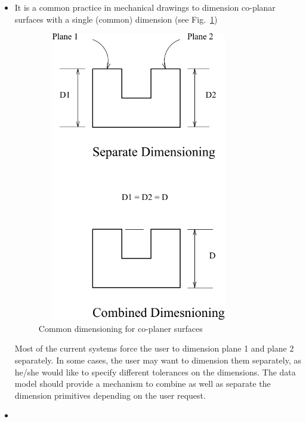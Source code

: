 	\begin{itemize}

	\item
	\label{dtdiff1}

	It is a common practice in mechanical drawings to dimension co-planar 
	surfaces with a single (common) dimension (see Fig.~\ref{dtlak1})


       \begin{figure}[htbp]
            \hspace{2cm}
            \includegraphics[width=3.5in,height=5.0in]{DTLAK1.pdf}
            \caption{Common dimensioning for co-planer surfaces}
            \label{dtlak1}
        \end{figure}


	Most of the current systems force the user to dimension plane 1 and plane 2 
	separately.
	In some cases, the user may want to dimension them separately, as he/she 
	would like to specify different tolerances on the dimensions. The data model
	should provide a mechanism to combine as well as separate the dimension
	primitives depending on the user request.

	\item
	\label{dtdiff2}


\end{itemize}
